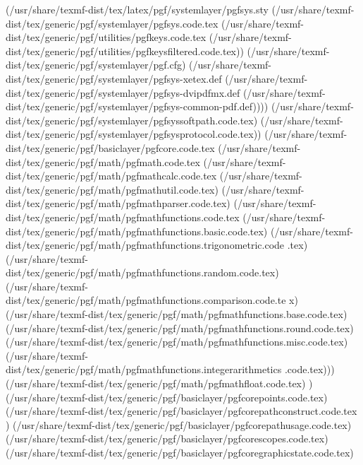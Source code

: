 (/usr/share/texmf-dist/tex/latex/pgf/systemlayer/pgfsys.sty
(/usr/share/texmf-dist/tex/generic/pgf/systemlayer/pgfsys.code.tex
(/usr/share/texmf-dist/tex/generic/pgf/utilities/pgfkeys.code.tex
(/usr/share/texmf-dist/tex/generic/pgf/utilities/pgfkeysfiltered.code.tex))
(/usr/share/texmf-dist/tex/generic/pgf/systemlayer/pgf.cfg)
(/usr/share/texmf-dist/tex/generic/pgf/systemlayer/pgfsys-xetex.def
(/usr/share/texmf-dist/tex/generic/pgf/systemlayer/pgfsys-dvipdfmx.def
(/usr/share/texmf-dist/tex/generic/pgf/systemlayer/pgfsys-common-pdf.def))))
(/usr/share/texmf-dist/tex/generic/pgf/systemlayer/pgfsyssoftpath.code.tex)
(/usr/share/texmf-dist/tex/generic/pgf/systemlayer/pgfsysprotocol.code.tex))
(/usr/share/texmf-dist/tex/generic/pgf/basiclayer/pgfcore.code.tex
(/usr/share/texmf-dist/tex/generic/pgf/math/pgfmath.code.tex
(/usr/share/texmf-dist/tex/generic/pgf/math/pgfmathcalc.code.tex
(/usr/share/texmf-dist/tex/generic/pgf/math/pgfmathutil.code.tex)
(/usr/share/texmf-dist/tex/generic/pgf/math/pgfmathparser.code.tex)
(/usr/share/texmf-dist/tex/generic/pgf/math/pgfmathfunctions.code.tex
(/usr/share/texmf-dist/tex/generic/pgf/math/pgfmathfunctions.basic.code.tex)
(/usr/share/texmf-dist/tex/generic/pgf/math/pgfmathfunctions.trigonometric.code
.tex)
(/usr/share/texmf-dist/tex/generic/pgf/math/pgfmathfunctions.random.code.tex)
(/usr/share/texmf-dist/tex/generic/pgf/math/pgfmathfunctions.comparison.code.te
x) (/usr/share/texmf-dist/tex/generic/pgf/math/pgfmathfunctions.base.code.tex)
(/usr/share/texmf-dist/tex/generic/pgf/math/pgfmathfunctions.round.code.tex)
(/usr/share/texmf-dist/tex/generic/pgf/math/pgfmathfunctions.misc.code.tex)
(/usr/share/texmf-dist/tex/generic/pgf/math/pgfmathfunctions.integerarithmetics
.code.tex))) (/usr/share/texmf-dist/tex/generic/pgf/math/pgfmathfloat.code.tex)
) (/usr/share/texmf-dist/tex/generic/pgf/basiclayer/pgfcorepoints.code.tex)
(/usr/share/texmf-dist/tex/generic/pgf/basiclayer/pgfcorepathconstruct.code.tex
) (/usr/share/texmf-dist/tex/generic/pgf/basiclayer/pgfcorepathusage.code.tex)
(/usr/share/texmf-dist/tex/generic/pgf/basiclayer/pgfcorescopes.code.tex)
(/usr/share/texmf-dist/tex/generic/pgf/basiclayer/pgfcoregraphicstate.code.tex)


